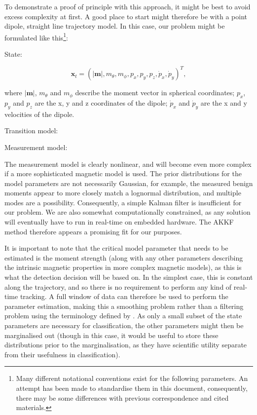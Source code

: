 \documentclass[10pt, a4paper, twocolumn]{article} %
\begin{document}
To demonstrate a proof of principle with this approach, it might be best to avoid excess complexity at first. A good place to start might therefore be with a point dipole, straight line trajectory model. In this case, our problem might be formulated like this\footnote{Many different notational conventions exist for the following parameters. An attempt has been made to standardise them in this document, consequently, there may be some differences with previous correspondence and cited materials.}:

State:

\begin{equation}
	\mathbf{x}_t = (\lvert \mathbf{m} \rvert, m_\theta, m_\phi, p_x,
	p_y, p_z, \dot p_x, \dot p_y)^T,
\end{equation}

where $\lvert \mathbf{m} \rvert$, $m_\theta$ and $m_\phi$ describe the moment vector in spherical coordinates; $p_x$, $p_y$ and $p_z$ are the x, y and z coordinates of the dipole; $\dot p_x$ and $\dot p_y$ are the x and y velocities of the dipole.

Transition model:

Measurement model:

The measurement model is clearly nonlinear, and will become even more complex if a more sophisticated magnetic model is used. The prior distributions for the model parameters are not necessarily Gaussian, for example, the measured benign moments appear to more closely match a lognormal distribution, and multiple modes are a possibility. Consequently, a simple Kalman filter is insufficient for our problem. We are also somewhat computationally constrained, as any solution will eventually have to run in real-time on embedded hardware. The AKKF method therefore appears a promising fit for our purposes.

It is important to note that the critical model parameter that needs to be estimated is the moment strength (along with any other parameters describing the intrinsic magnetic properties in more complex magnetic models), as this is what the detection decision will be based on. In the simplest case, this is constant along the trajectory, and so there is no requirement to perform any kind of real-time tracking. A full window of data can therefore be used to perform the parameter estimation, making this a smoothing problem rather than a filtering problem using the terminology defined by \parencite{Briers2009}. As only a small subset of the state parameters are necessary for classification, the other parameters might then be marginalised out (though in this case, it would be useful to store these distributions prior to the marginalisation, as they have scientific utility separate from their usefulness in classification).
\end{document}
